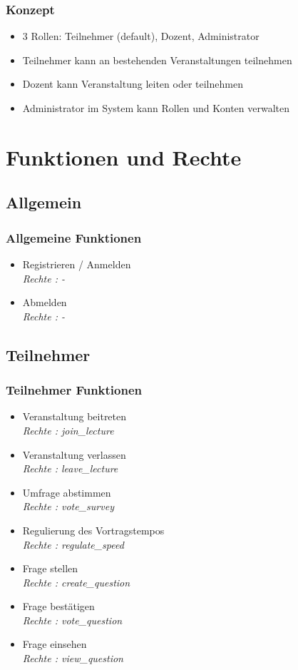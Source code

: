 \documentclass[german,a4paper]{beamer}
\begin{document}
\begin{frame} 
\frametitle{Konzept}
\begin{itemize}
  \item{}
  3 Rollen: Teilnehmer (default), Dozent, Administrator
  \item
  Teilnehmer kann an bestehenden Veranstaltungen teilnehmen
  \item{}
  Dozent kann Veranstaltung leiten oder teilnehmen
  \item{}
  Administrator im System kann Rollen und Konten verwalten
\end{itemize}
\end{frame}

\section{Funktionen und Rechte}
\subsection{Allgemein}
\begin{frame} 
\frametitle{Allgemeine Funktionen}
\begin{itemize}
  \item{}
  Registrieren / Anmelden \\
  \quad \emph{Rechte : -}
  \item{} 
  Abmelden  \\
  \quad \emph{Rechte : -}
\end{itemize}
\end{frame}

\subsection{Teilnehmer}
\begin{frame} 
\frametitle{Teilnehmer Funktionen}
\begin{itemize}
  \item{}
  Veranstaltung beitreten \\
  \quad \emph{Rechte : join\_lecture}
  \item{} 
  Veranstaltung verlassen  \\
  \quad \emph{Rechte : leave\_lecture}
  \item{} 
  Umfrage abstimmen  \\
  \quad \emph{Rechte : vote\_survey}
  \item{} 
  Regulierung des Vortragstempos  \\
  \quad \emph{Rechte : regulate\_speed}
  \item{} 
  Frage stellen  \\
  \quad \emph{Rechte : create\_question}
  \item{} 
  Frage best\"{a}tigen  \\
  \quad \emph{Rechte : vote\_question}
  \item{} 
  Frage einsehen  \\
  \quad \emph{Rechte : view\_question}
\end{itemize}
\end{frame}
\end{document}
